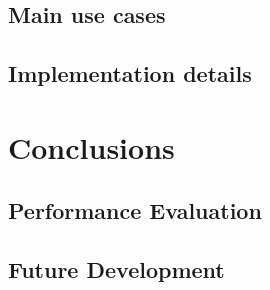 \documentclass[12pt, a4paper]{report}
\begin{document}
\section{Main use cases}


\section{Implementation details}

\newpage



\newpage{}

\chapter{Conclusions}


\section{Performance Evaluation} 


\section{Future Development}


\renewcommand{\bibname}{Bibliography}

\end{document}
